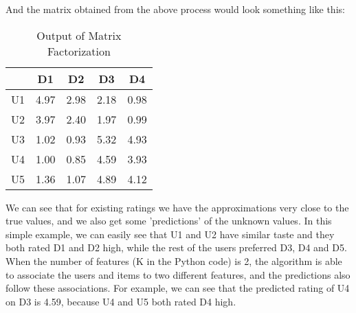  And the matrix obtained from the above process would look something like this:
\begin{table}[ht]
\caption{Output of Matrix Factorization}
\centering %
\begin{tabular}{c c c c c}
\hline\hline %
& D1 & D2 & D3 & D4 \\ [0.5ex] %
\hline %
U1 & 4.97 & 2.98 & 2.18 & 0.98\\ %
U2 & 3.97 & 2.40 & 1.97 & 0.99\\
U3 & 1.02 & 0.93 & 5.32 & 4.93\\
U4 & 1.00 & 0.85 & 4.59 & 3.93\\
U5 & 1.36 & 1.07 & 4.89 & 4.12\\ [1ex] %
\hline %
\end{tabular}
\end{table}

 We can see that for existing ratings we have the approximations very close to the true values, and we also get some 'predictions' of the unknown values. In this simple example, we can easily see that U1 and U2 have similar taste and they both rated D1 and D2 high, while the rest of the users preferred D3, D4 and D5. When the number of features (K in the Python code) is 2, the algorithm is able to associate the users and items to two different features, and the predictions also follow these associations. For example, we can see that the predicted rating of U4 on D3 is 4.59, because U4 and U5 both rated D4 high.

